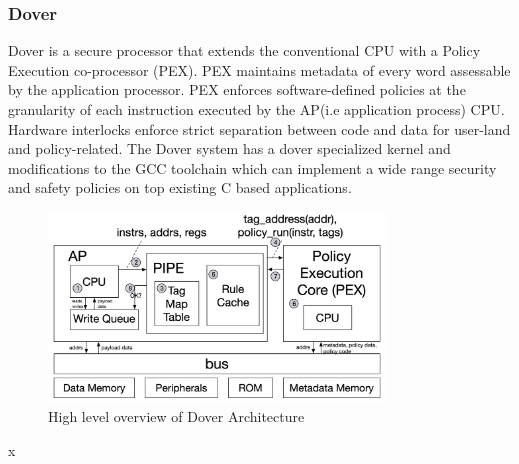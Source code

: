 \subsubsection{Dover}
Dover\cite{Dover} is a secure processor that extends the conventional CPU with
a Policy Execution co-processor (PEX). PEX maintains metadata 
of every word assessable by the application processor. PEX 
enforces software-defined policies
at the granularity of each instruction executed by the AP(i.e application process)
CPU. Hardware interlocks enforce strict separation between code and data 
for user-land and policy-related. The Dover system has 
a dover specialized kernel and modifications to the GCC toolchain 
which can implement a wide range security and safety policies on 
top existing C based applications. 

\begin{figure}[htbp!] 
  \centering    
  \includegraphics[width=0.8\textwidth]{Dover}
  \caption[Dover]{High level overview of Dover Architecture \cite{Dover}}
  \label{fig:Dover}
  \end{figure}x





